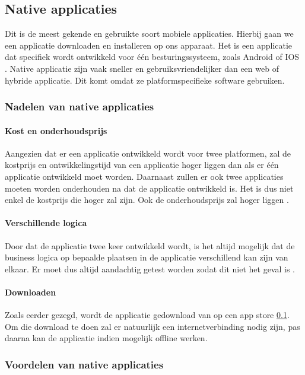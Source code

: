 \subsection{Native applicaties}\label{ch:native-applicaties}
Dit is de meest gekende en gebruikte soort mobiele applicaties. Hierbij gaan we een applicatie 
downloaden en installeren op ons apparaat. Het is een applicatie dat specifiek wordt ontwikkeld 
voor één besturingssysteem, zoals Android of IOS \autocite{Laarhoven2021}. Native applicatie 
zijn vaak sneller en gebruiksvriendelijker dan een web of hybride applicatie. Dit komt omdat 
ze platformspecifieke software gebruiken. 

\subsubsection{Nadelen van native applicaties}
\paragraph{Kost en onderhoudsprijs}
Aangezien dat er een applicatie ontwikkeld wordt voor twee platformen, zal de kostprijs en 
ontwikkelingstijd van een applicatie hoger liggen dan als er één applicatie ontwikkeld moet 
worden. Daarnaast zullen er ook twee applicaties moeten worden onderhouden na dat de applicatie 
ontwikkeld is. Het is dus niet enkel de kostprijs die hoger zal zijn. Ook de onderhoudsprijs zal 
hoger liggen \autocite{AWS2023}. 

\paragraph{Verschillende logica}
Door dat de applicatie twee keer ontwikkeld wordt, is het altijd mogelijk dat de business 
logica op bepaalde plaatsen in de applicatie verschillend kan zijn van elkaar. 
Er moet dus altijd aandachtig getest worden zodat dit niet het geval is \autocite{Kotlin2023}.

\paragraph{Downloaden}
Zoals eerder gezegd, wordt de applicatie gedownload van op een app store \ref{ch:native-applicaties}. 
Om die download te doen zal er natuurlijk een internetverbinding nodig zijn, 
pas daarna kan de applicatie indien mogelijk offline werken.

\subsubsection{Voordelen van native applicaties}
\label{ch:voordelen-native-applicaties}
